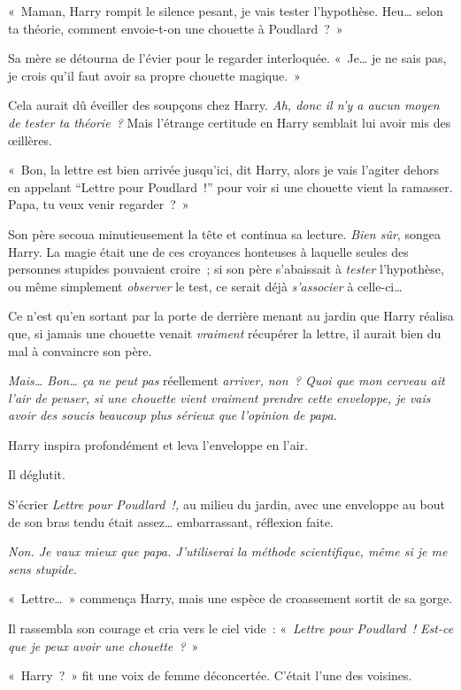 «~Maman, Harry rompit le silence pesant, je vais tester l'hypothèse. Heu… selon ta théorie, comment envoie-t-on une chouette à Poudlard~?~»

Sa mère se détourna de l'évier pour le regarder interloquée. «~Je… je ne sais pas, je crois qu'il faut avoir sa propre chouette magique.~»

Cela aurait dû éveiller des soupçons chez Harry. \emph{Ah, donc il n'y a aucun moyen de tester ta théorie~?} Mais l'étrange certitude en Harry semblait lui avoir mis des œillères.

«~Bon, la lettre est bien arrivée jusqu'ici, dit Harry, alors je vais l'agiter dehors en appelant ``Lettre pour Poudlard~!'' pour voir si une chouette vient la ramasser. Papa, tu veux venir regarder~?~»

Son père secoua minutieusement la tête et continua sa lecture.  \emph{Bien sûr}, songea Harry. La magie était une de ces croyances honteuses à laquelle seules des personnes stupides pouvaient croire~; si son père s'abaissait à \emph{tester} l'hypothèse, ou même simplement \emph{observer} le test, ce serait déjà \emph{s'associer} à celle-ci…

Ce n'est qu'en sortant par la porte de derrière menant au jardin que Harry réalisa que, si jamais une chouette venait \emph{vraiment} récupérer la lettre, il aurait bien du mal à convaincre son père.

\emph{Mais… Bon… ça ne peut pas} réellement \emph{arriver, non~? Quoi que mon cerveau ait l'air de penser, si une chouette vient vraiment prendre cette enveloppe, je vais avoir des soucis beaucoup plus sérieux que l'opinion de papa.}

Harry inspira profondément et leva l'enveloppe en l'air.

Il déglutit.

S'écrier \emph{Lettre pour Poudlard~!,} au milieu du jardin, avec une enveloppe au bout de son bras tendu était assez… embarrassant, réflexion faite.

\emph{Non. Je vaux mieux que papa. J'utiliserai la méthode scientifique, même si je me sens stupide.}

«~Lettre…~» commença Harry, mais une espèce de croassement sortit de sa gorge.

Il rassembla son courage et cria vers le ciel vide~: «~\emph{Lettre pour Poudlard~! Est-ce que je peux avoir une chouette~?}~»

«~Harry~?~» fit une voix de femme déconcertée. C'était l'une des voisines.


